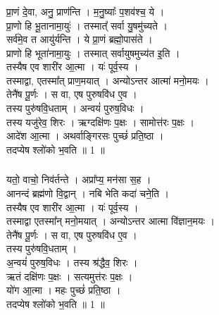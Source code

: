 \subsubsection{}
प्रा॒णं दे॒वा, अनु॒ प्राण॑न्ति । म॒नु॒ष्याः᳚ प॒शव॑श्च॒ ये ।\\
प्रा॒णो हि भू॒तानामा॒युः॑ । तस्मात्᳚ सर्वा यु॒षमु॑च्यते ।\\
सर्व॑मे॒व त आयु॑र्यन्ति । ये प्रा॒णं ब्रह्मो॒पास॑ते ।\\
प्राणो हि भूता॑नामा॒युः । तस्मात् सर्वायुषमुच्य॑त इ॒ति ।\\
तस्यैष एव शारी॑र आ॒त्मा । यः॑ पूर्व॒स्य ।\\
तस्माद्वा, एतस्मा᳚त् प्राण॒मयात् । अन्योऽन्तर आत्मा॑ मनो॒मयः ।\\
तेनै॑ष पू॒र्णः । स वा, एष पुरुषवि॑ध ए॒व ।\\
तस्य पुरु॑षवि॒धताम् । अन्वयं॑ पुरुष॒विधः ।\\
तस्य यजु॑रेव॒ शिरः । ऋग्दक्षि॑णः प॒क्षः । सामोत्त॑रः प॒क्षः ।\\
आदे॑श आ॒त्मा । अथर्वाङ्गिरसः पुच्छं॑ प्रति॒ष्ठा ।\\
तदप्येष श्लो॑को भ॒वति ॥ 1 ॥\\
\subsubsection{}
यतो॒ वाचो॒ निव॑र्तन्ते । अप्रा᳚प्य॒ मन॑सा स॒ह ।\\
आनन्दं ब्रह्म॑णो वि॒द्वान् । नबि भेति कदा॑ चने॒ति ।\\
तस्यैष एव शारी॑र आ॒त्मा । यः॑ पूर्व॒स्य ।\\
तस्माद्वा एतस्मा᳚न् मनो॒मयात् । अन्योऽन्तर आत्मा वि॑ज्ञान॒मयः ।\\
तेनै॑ष पू॒र्णः । स वा, एष पुरुषवि॑ध ए॒व ।\\
तस्य पुरु॑षवि॒धताम् ।\\
अ॒न्वयं॑ पुरुष॒विधः । तस्य श्र॑द्धैव॒ शिरः ।\\
ऋतं दक्षि॑णः प॒क्षः । सत्यमुत्त॑रः प॒क्षः । \\
यो॑ग आ॒त्मा । महः पुच्छं॑ प्रति॒ष्ठा ।\\
तदप्येष श्लो॑को भ॒वति ॥ 1 ॥\\
